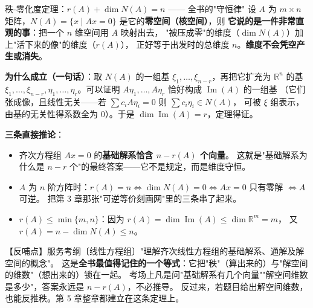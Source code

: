 \begin{fdeep}{秩-零化度定理：$r(A)+\dim N(A)=n$ —— 全书的"守恒律"}
设 $A$ 为 $m\times n$ 矩阵，$N(A)=\{x\mid Ax=0\}$ 是它的\textbf{零空间（核空间）}，则
\textbf{它说的是一件非常直观的事}：把一个 $n$ 维空间用 $A$ 映射出去，
"被压成零"的维度（$\dim N(A)$）加上"活下来的像"的维度（$r(A)$），
正好等于出发时的总维度 $n$。\textbf{维度不会凭空产生或消失}。

\textbf{为什么成立（一句话）}：取 $N(A)$ 的一组基 $\xi_1,\dots,\xi_{n-r}$，再把它扩充为 $\mathbb{R}^n$ 的基
$\xi_1,\dots,\xi_{n-r},\eta_1,\dots,\eta_r$。可以证明 $A\eta_1,\dots,A\eta_r$ 恰好构成 $\operatorname{Im}(A)$ 的一组基
（它们张成像，且线性无关——若 $\sum c_iA\eta_i=0$ 则 $\sum c_i\eta_i\in N(A)$，
可被 $\xi$ 组表示，由基的无关性得系数全为 $0$）。于是 $\dim\operatorname{Im}(A)=r$，定理得证。

\textbf{三条直接推论}：
\begin{itemize}[leftmargin=2.2em,itemsep=0.22em]
\item 齐次方程组 $Ax=0$ 的\textbf{基础解系恰含 $n-r(A)$ 个向量}。
      这就是"基础解系为什么是 $n-r$ 个"的最终答案——它不是规定，而是维度守恒。
\item $A$ 为 $n$ 阶方阵时：$r(A)=n\iff\dim N(A)=0\iff Ax=0$ 只有零解 $\iff A$ 可逆。
      把第 3 章那张"可逆等价刻画网"里的三条串了起来。
\item $r(A)\le\min\{m,n\}$：因为 $r(A)=\dim\operatorname{Im}(A)\le\dim\mathbb{R}^m=m$，
      又 $r(A)=n-\dim N(A)\le n$。
\end{itemize}
【反哺点】服务考纲〔线性方程组〕"理解齐次线性方程组的基础解系、通解及解空间的概念"。
这是\textbf{全书最值得记住的一个等式}：它把"秩"（算出来的）与"解空间的维数"（想出来的）锁在一起。
考场上凡是问"基础解系有几个向量""解空间维数是多少"，答案永远是 $n-r(A)$，不必推导。
反过来，若题目给出解空间维数，也能反推秩。第 5 章整章都建立在这条定理上。
\end{fdeep}

